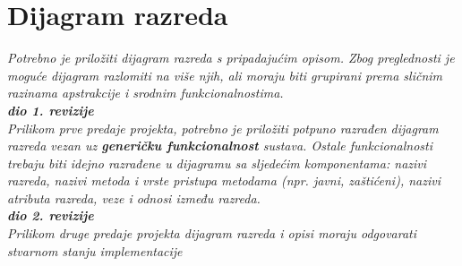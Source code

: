 			\eject
			
			
		\section{Dijagram razreda}
		
			\textit{Potrebno je priložiti dijagram razreda s pripadajućim opisom. Zbog preglednosti je moguće dijagram razlomiti na više njih, ali moraju biti grupirani prema sličnim razinama apstrakcije i srodnim funkcionalnostima.}\\
			
			\textbf{\textit{dio 1. revizije}}\\
			
			\textit{Prilikom prve predaje projekta, potrebno je priložiti potpuno razrađen dijagram razreda vezan uz \textbf{generičku funkcionalnost} sustava. Ostale funkcionalnosti trebaju biti idejno razrađene u dijagramu sa sljedećim komponentama: nazivi razreda, nazivi metoda i vrste pristupa metodama (npr. javni, zaštićeni), nazivi atributa razreda, veze i odnosi između razreda.}\\
			
			\textbf{\textit{dio 2. revizije}}\\			
			
			\textit{Prilikom druge predaje projekta dijagram razreda i opisi moraju odgovarati stvarnom stanju implementacije}
			
			
			
			\eject
		
%			
%			
%			
%			
%			
%		
%			
%			
%			
%		
%		
